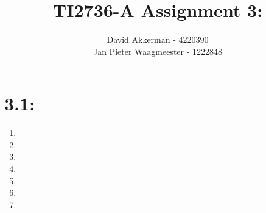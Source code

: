 \documentclass[a4paper,10pt,fleqn]{article}
\title{TI2736-A Assignment 3:}
\author{
    David Akkerman - 4220390 \\
    Jan Pieter Waagmeester - 1222848 \\
}
\begin{document}
\maketitle

\section*{3.1: }
\begin{enumerate}[1.]
	\item

	\item

	\item

	\item

	\item

	\item

	\item

\end{enumerate}
\end{document}
